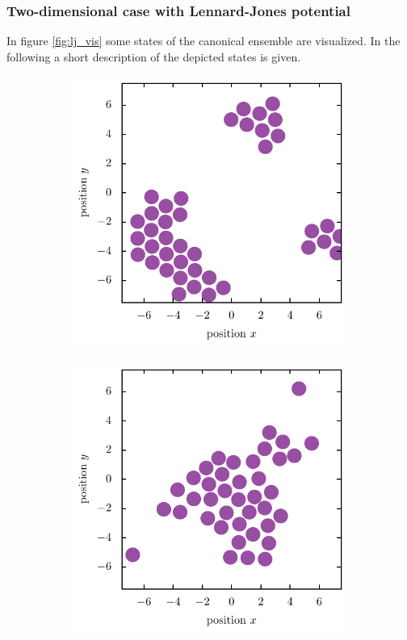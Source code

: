 \documentclass[11pt, a4paper]{article}
\numberwithin{equation}{section}
\begin{document}
\subsubsection{Two-dimensional case with Lennard-Jones potential}
In figure \ref{fig:lj_vis} some states of the canonical ensemble are visualized.
In the following a short description of the depicted states is given.
\begin{figure}[h]
	\begin{subfigure}[t]{0.48\textwidth}
		\centering
		\includegraphics[width=\textwidth]{figures/Beta_100_LJ.pdf}
		\label{fig:lj_multiple_clusters}
		\vspace*{0.3cm}
	\end{subfigure}
	\hfill
	\begin{subfigure}[t]{0.48\textwidth}
		\centering
		\includegraphics[width=\textwidth]{figures/Beta_10_LJ.pdf}

\end{subfigure}
\end{figure}
\end{document}
